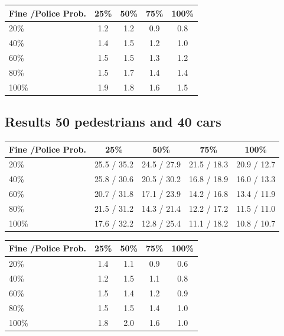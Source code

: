\documentclass[a4paper]{article}
\begin{document}
\begin{table}[H]
\centering
\begin{tabular}{ l | c c c c }
  Fine \slash Police Prob. & 25\% & 50\% & 75\% & 100\% \\ 
  \hline
  20\%  & 1.2 & 1.2 & 0.9 & 0.8  \\
  40\%  & 1.4 & 1.5 & 1.2 & 1.0  \\
  60\%  & 1.5 & 1.5 & 1.3 & 1.2  \\
  80\%  & 1.5 & 1.7 & 1.4 & 1.4  \\
  100\% & 1.9 & 1.8 & 1.6 & 1.5  \\
\end{tabular}
\end{table}

\subsection{Results 50 pedestrians and 40 cars}
\begin{table}[H]
\centering
\begin{tabular}{ l | c c c c }
  Fine \slash Police Prob. & 25\% & 50\% & 75\% & 100\% \\ 
  \hline
  20\%  & 25.5 / 35.2 & 24.5 / 27.9 & 21.5 / 18.3 & 20.9 / 12.7  \\
  40\%  & 25.8 / 30.6 & 20.5 / 30.2 & 16.8 / 18.9 & 16.0 / 13.3  \\
  60\%  & 20.7 / 31.8 & 17.1 / 23.9 & 14.2 / 16.8 & 13.4 / 11.9  \\
  80\%  & 21.5 / 31.2 & 14.3 / 21.4 & 12.2 / 17.2 & 11.5 / 11.0  \\
  100\% & 17.6 / 32.2 & 12.8 / 25.4 & 11.1 / 18.2 & 10.8 / 10.7  \\
\end{tabular}
\end{table}

\begin{table}[H]
\centering
\begin{tabular}{ l | c c c c }
  Fine \slash Police Prob. & 25\% & 50\% & 75\% & 100\% \\ 
  \hline
  20\%  & 1.4 & 1.1 & 0.9 & 0.6  \\
  40\%  & 1.2 & 1.5 & 1.1 & 0.8  \\
  60\%  & 1.5 & 1.4 & 1.2 & 0.9  \\
  80\%  & 1.5 & 1.5 & 1.4 & 1.0  \\
  100\% & 1.8 & 2.0 & 1.6 & 1.0  \\
\end{tabular}
\end{table}
\end{document}
